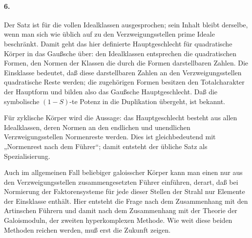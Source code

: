 \documentclass[11pt]{article}
\begin{document}
\paragraph{6.}
Der Satz ist für die vollen Idealklassen ausgesprochen; sein Inhalt bleibt derselbe, wenn man sich wie üblich auf zu den Verzweigungsstellen prime Ideale beschränkt. Damit geht das hier definierte Hauptgeschlecht für quadratische Körper in das Gaußsche über: den Idealklassen entsprechen die quadratischen Formen, den Normen der Klassen die durch die Formen darstellbaren Zahlen. Die Einsklasse bedeutet, daß diese darstellbaren Zahlen an den Verzweigungsstellen quadratische Reste werden; die zugehörigen Formen besitzen den Totalcharakter der Hauptform und bilden also das Gaußsche Hauptgeschlecht. Daß die symbolische \((1-S)\)-te Potenz in die Duplikation übergeht, ist bekannt.

Für zyklische Körper wird die Aussage: das Hauptgeschlecht besteht aus allen Idealklassen, deren Normen an den endlichen und unendlichen Verzweigungsstellen Normenreste werden. Dies ist gleichbedeutend mit „Normenrest nach dem Führer“; damit entsteht der übliche Satz als Spezialisierung.

Auch im allgemeinen Fall beliebiger galoisscher Körper kann man einen nur aus den Verzweigungsstellen zusammengesetzten Führer einführen, derart, daß bei Normierung der Faktorensysteme für jede dieser Stellen der Strahl nur Elemente der Einsklasse enthält. Hier entsteht die Frage nach dem Zusammenhang mit den Artinschen Führern und damit nach dem Zusammenhang mit der Theorie der Galoismoduln, der zweiten hyperkomplexen Methode. Wie weit diese beiden Methoden reichen werden, muß erst die Zukunft zeigen.
\end{document}
